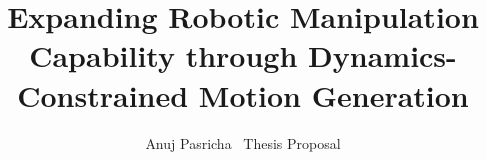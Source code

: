 \documentclass[conference]{IEEEtran}
\begin{document}
\title{Expanding Robotic Manipulation Capability through Dynamics-Constrained Motion Generation}
\author{Anuj Pasricha \textbar\ Thesis Proposal}

\maketitle

\IEEEpeerreviewmaketitle










\end{document}
